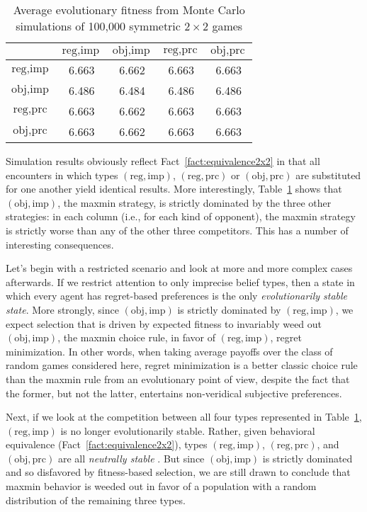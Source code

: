 \documentclass[fleqn,reqno,11pt]{article}
\begin{document}
\begin{table}[t]
\centering
\begin{tabular}{ccccc}
  \toprule
 & $\text{reg}, \text{imp}$ 
 & $\text{obj}, \text{imp}$ 
 & $\text{reg}, \text{prc}$ 
 & $\text{obj}, \text{prc}$ \\ 
  \midrule
  $\text{reg}, \text{imp}$ & 6.663 & 6.662 & 6.663 & 6.663 \\ 
  $\text{obj}, \text{imp}$ & 6.486 & 6.484 & 6.486 & 6.486 \\ 
  $\text{reg}, \text{prc}$ & 6.663 & 6.662 & 6.663 & 6.663 \\  
  $\text{obj}, \text{prc}$ & 6.663 & 6.662 & 6.663 & 6.663 \\ 
   \bottomrule
\end{tabular}                    
\caption{Average evolutionary fitness from Monte Carlo simulations of 100,000 symmetric $2 \times 2$ games}
\label{tab:ExpectedFitness_4Types}
\end{table}

Simulation results obviously reflect Fact~\ref{fact:equivalence2x2} in that all encounters in
which types $(\text{reg}, \text{imp})$, $(\text{reg}, \text{prc})$ or
$(\text{obj}, \text{prc})$ are substituted for one another yield identical results. More
interestingly, Table~\ref{tab:ExpectedFitness_4Types} shows that $(\text{obj}, \text{imp})$,
the maxmin strategy, is strictly dominated by the three other strategies: in each column (i.e.,
for each kind of opponent), the maxmin strategy is strictly worse than any of the other three
competitors. This has a number of interesting consequences.

Let's begin with a restricted scenario and look at more and more complex cases afterwards. If
we restrict attention to only imprecise belief types, then a state in which every agent has
regret-based preferences is the only \emph{evolutionarily stable state}. More strongly, since
$(\text{obj}, \text{imp})$ is strictly dominated by $(\text{reg}, \text{imp})$, we expect
selection that is driven by expected fitness to invariably weed out $(\text{obj}, \text{imp})$,
the maxmin choice rule, in favor of $(\text{reg}, \text{imp})$, regret minimization. In other
words, when taking average payoffs over the class of random games considered here, regret
minimization is a better classic choice rule than the maxmin rule from an evolutionary point of
view, despite the fact that the former, but not the latter, entertains non-veridical subjective
preferences.

Next, if we look at the competition between all four types represented in
Table~\ref{tab:ExpectedFitness_4Types}, $(\text{reg}, \text{imp})$ is no longer evolutionarily
stable. Rather, given behavioral equivalence (Fact~\ref{fact:equivalence2x2}), types
$(\text{reg}, \text{imp})$, $(\text{reg}, \text{prc})$, and $(\text{obj}, \text{prc})$ are all
\emph{neutrally stable} \citep{Maynard-Smith1982:Evolution-and-t}. But since
$(\text{obj}, \text{imp})$ is strictly dominated and so disfavored by fitness-based selection,
we are still drawn to conclude that maxmin behavior is weeded out in favor of a population with
a random distribution of the remaining three types.
\end{document}
